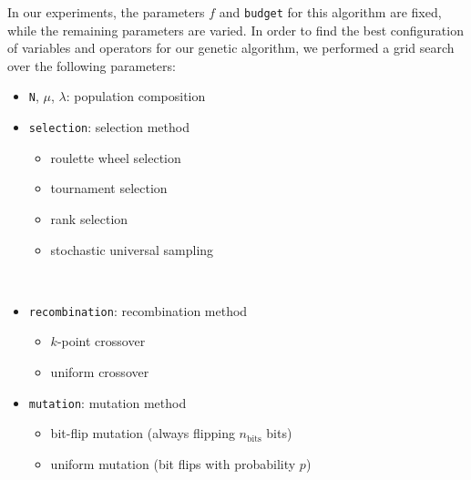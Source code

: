 \documentclass{article}
\begin{document}
\newpage


In our experiments, the parameters $f$ and \texttt{budget} for this algorithm are fixed, while the remaining parameters are varied.
In order to find the best configuration of variables and operators for our genetic algorithm, we performed a grid search over the following parameters:

\begin{minipage}{0.45\textwidth}   
    \begin{itemize}
        \item \texttt{N}, $\mu$, $\lambda$: population composition
        \item \texttt{selection}: selection method
        \begin{itemize}
            \item roulette wheel selection
            \item tournament selection
            \item rank selection
            \item stochastic universal sampling
        \end{itemize}
    \end{itemize}
\end{minipage}
~
\begin{minipage}{0.55\textwidth}
    \begin{itemize}
        \item \texttt{recombination}: recombination method
        \begin{itemize}
            \item $k$-point crossover
            \item uniform crossover
        \end{itemize}
        \item \texttt{mutation}: mutation method
        \begin{itemize}
            \item bit-flip mutation (always flipping $n_{\mathrm{bits}}$ bits)
            \item uniform mutation (bit flips with probability $p$)
        \end{itemize}
    \end{itemize}
\end{minipage}

\end{document}
